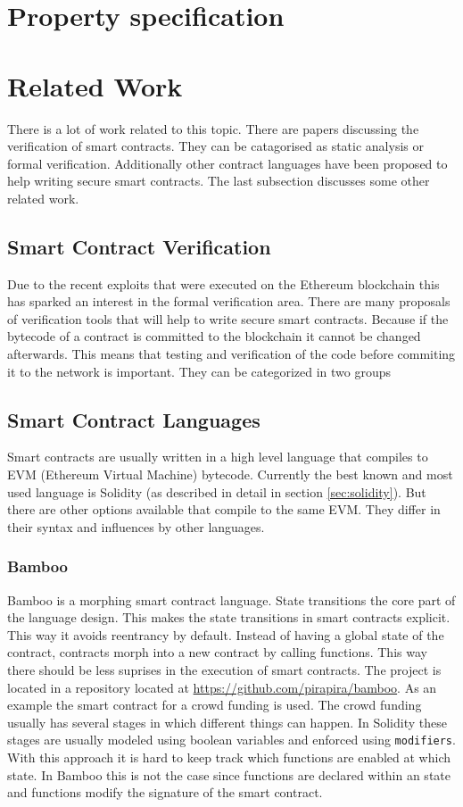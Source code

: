 \documentclass[a4paper]{article}
\begin{document}
\section{Property specification}


\section{Related Work}
There is a lot of work related to this topic. There are papers discussing the verification of smart contracts. They can be catagorised as static analysis or formal verification. Additionally other contract languages have been proposed to help writing secure smart contracts. The last subsection discusses some other related work.
\subsection{Smart Contract Verification}
Due to the recent exploits that were executed on the Ethereum blockchain this has sparked an interest in the formal verification area. There are many proposals of verification tools that will help to write secure smart contracts. Because if the bytecode of a contract is committed to the blockchain it cannot be changed afterwards. This means that testing and verification of the code before commiting it to the network is important. They can be categorized in two groups

\subsection{Smart Contract Languages}
Smart contracts are usually written in a high level language that compiles to EVM (Ethereum Virtual Machine) bytecode. Currently the best known and most used language is Solidity (as described in detail in section \ref{sec:solidity}). But there are other options available that compile to the same EVM. They differ in their syntax and influences by other languages.  
\subsubsection{Bamboo}
Bamboo is a morphing smart contract language. State transitions the core part of the language design. This makes the state transitions in smart contracts explicit. This way it avoids reentrancy by default. Instead of having a global state of the contract, contracts morph into a new contract by calling functions. This way there should be less suprises in the execution of smart contracts. The project is located in a repository located at \url{https://github.com/pirapira/bamboo}. As an example the smart contract for a crowd funding is used. The crowd funding usually has several stages in which different things can happen. In Solidity these stages are usually modeled using boolean variables and enforced using \texttt{modifiers}. With this approach it is hard to keep track which functions are enabled at which state. In Bamboo this is not the case since functions are declared within an state and functions modify the signature of the smart contract. 
\end{document}
